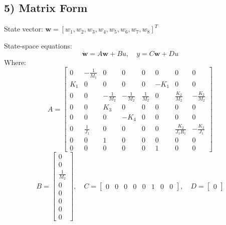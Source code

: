 \documentclass{article}
\begin{document}
\subsection*{5) Matrix Form}
State vector: \( \mathbf{w} = [w_1, w_2, w_3, w_4, w_5, w_6, w_7, w_8]^T \)

State-space equations:
\[
\mathbf{\dot{w}} = A \mathbf{w} + B u, \quad y = C \mathbf{w} + D u
\]
Where:
\[
A = \begin{bmatrix}
0 & -\frac{1}{M_1} & 0 & 0 & 0 & 0 & 0 & 0 \\
K_1 & 0 & 0 & 0 & 0 & -K_1 & 0 & 0 \\
0 & 0 & -\frac{1}{M_2} & -\frac{1}{M_2} & \frac{1}{M_2} & 0 & \frac{K_2}{M_2} & -\frac{K_2}{M_2} \\
0 & 0 & K_3 & 0 & 0 & 0 & 0 & 0 \\
0 & 0 & 0 & -K_4 & 0 & 0 & 0 & 0 \\
0 & \frac{1}{J_1} & 0 & 0 & 0 & 0 & \frac{K_2}{J_1 R_1} & -\frac{K_2}{J_1} \\
0 & 0 & 1 & 0 & 0 & 0 & 0 & 0 \\
0 & 0 & 0 & 0 & 0 & 1 & 0 & 0
\end{bmatrix}
\]
\[
B = \begin{bmatrix} 0 \\ 0 \\ \frac{1}{M_2} \\ 0 \\ 0 \\ 0 \\ 0 \\ 0 \end{bmatrix}, \quad
C = \begin{bmatrix} 0 & 0 & 0 & 0 & 0 & 1 & 0 & 0 \end{bmatrix}, \quad
D = \begin{bmatrix} 0 \end{bmatrix}
\]
\end{document}
